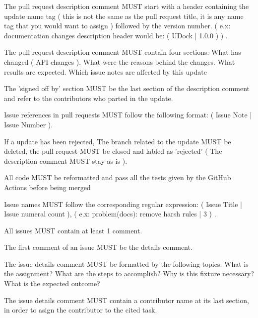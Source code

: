 \documentclass[13pt]{scrarticle}
\newcommand{\nexusrule}[1]{\Tribar[1][white][yellow][red]\color{blue} #1}
\begin{document}
      \nexusrule{ The pull request description comment MUST start with a header containing the update name tag ( this is not the same as the pull request title, it is any name tag that you would want to assign ) followed by the version number. ( e.x: documentation changes description header would be: ( UDock | 1.0.0 ) ) .} \newline

      \nexusrule{ The pull request description comment MUST contain four sections: What has changed ( API changes ). What were the reasons behind the changes. What results are expected. Which issue notes are affected by this update} \newline

      \nexusrule{ The 'signed off by' section MUST be the last section of the description comment and refer to the contributors who parted in the update.} \newline

      \nexusrule{ Issue references in pull requests MUST follow the following format: ( Issue Note | { Issue Number } ).} \newline

      \nexusrule{ If a update has been rejected, The branch related to the update MUST be deleted, the pull request MUST be closed and labled as 'rejected' ( The description comment MUST stay as is ).} \newline

      \nexusrule{ All code MUST be reformatted and pass all the tests given by the GitHub Actions before being merged} \newline

      \nexusrule{ Issue names MUST follow the corresponding regular expression: ( { Issue Title } | { Issue numeral count } ), ( e.x: problem(docs): remove harsh rules | 3 ) .} \newline

      \nexusrule{ All issues MUST contain at least 1 comment.} \newline

      \nexusrule{ The first comment of an issue MUST be the  details  comment.} \newline

      \nexusrule{ The issue  details  comment MUST be formatted by the following topics: What is the assignment? What are the steps to accomplish? Why is this fixture necessary? What is the expected outcome?} \newline

      \nexusrule{ The issue  details  comment MUST contain a contributor name at its last section, in order to asign the contributor to the cited task.} \newline
\end{document}
